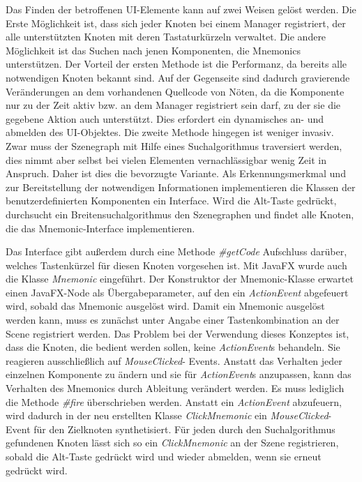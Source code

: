 Das Finden der betroffenen UI-Elemente kann auf zwei Weisen gelöst werden. Die Erste Möglichkeit ist, dass sich jeder Knoten bei einem Manager registriert, der alle unterstützten Knoten mit deren Tastaturkürzeln verwaltet. Die andere Möglichkeit ist das Suchen nach jenen Komponenten, die Mnemonics unterstützen. Der Vorteil der ersten Methode ist die Performanz, da bereits alle notwendigen Knoten bekannt sind. Auf der Gegenseite sind dadurch gravierende Veränderungen an dem vorhandenen Quellcode von Nöten, da die Komponente nur zu der Zeit aktiv bzw. an dem Manager registriert sein darf, zu der sie die gegebene Aktion auch unterstützt. Dies erfordert ein dynamisches an- und abmelden des UI-Objektes. Die zweite Methode hingegen ist weniger invasiv. Zwar muss der Szenegraph mit Hilfe eines Suchalgorithmus traversiert werden, dies nimmt aber selbst bei vielen Elementen vernachlässigbar wenig Zeit in Anspruch. Daher ist dies die bevorzugte Variante. Als Erkennungsmerkmal und zur Bereitstellung der notwendigen Informationen implementieren die Klassen der benutzerdefinierten Komponenten ein Interface. Wird die Alt-Taste gedrückt, durchsucht ein Breitensuchalgorithmus den Szenegraphen und findet alle Knoten, die das Mnemonic-Interface implementieren.\par
Das Interface gibt außerdem durch eine Methode \textit{\#{}getCode} Aufschluss darüber, welches Tastenkürzel für diesen Knoten vorgesehen ist. Mit JavaFX wurde auch die Klasse \textit{Mnemonic} eingeführt. Der Konstruktor der Mnemonic-Klasse erwartet einen JavaFX-Node als Übergabeparameter, auf den ein \textit{ActionEvent} abgefeuert wird, sobald das Mnemonic ausgelöst wird. Damit ein Mnemonic ausgelöst werden kann, muss es zunächst unter Angabe einer Tastenkombination an der Scene registriert werden. Das Problem bei der Verwendung dieses Konzeptes ist, dass die Knoten, die bedient werden sollen, keine \textit{ActionEvent}s behandeln. Sie reagieren ausschließlich auf \textit{MouseClicked}- Events. Anstatt das Verhalten jeder einzelnen Komponente zu ändern und sie für \textit{ActionEvent}s anzupassen, kann das Verhalten des Mnemonics durch Ableitung verändert werden. Es muss lediglich die Methode \textit{\#{}fire} überschrieben werden. Anstatt ein \textit{ActionEvent} abzufeuern, wird dadurch in der neu erstellten Klasse \textit{ClickMnemonic} ein \textit{MouseClicked}- Event für den Zielknoten synthetisiert. Für jeden durch den Suchalgorithmus gefundenen Knoten lässt sich so ein \textit{ClickMnemonic} an der Szene registrieren, sobald die Alt-Taste gedrückt wird und wieder abmelden, wenn sie erneut gedrückt wird.\par
